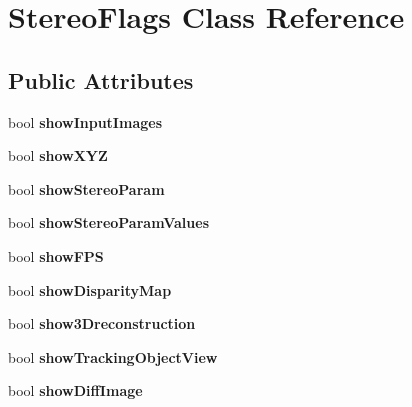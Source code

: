 \hypertarget{class_stereo_flags}{}\section{Stereo\+Flags Class Reference}
\label{class_stereo_flags}
\subsection*{Public Attributes}
\begin{DoxyCompactItemize}
\item 
bool {\bfseries show\+Input\+Images}\hypertarget{class_stereo_flags_af25bd7777d888a82559ebe8d5030cd80}{}\label{class_stereo_flags_af25bd7777d888a82559ebe8d5030cd80}

\item 
bool {\bfseries show\+X\+YZ}\hypertarget{class_stereo_flags_a0cb450ccdbb7c5709a7f33aec9d38577}{}\label{class_stereo_flags_a0cb450ccdbb7c5709a7f33aec9d38577}

\item 
bool {\bfseries show\+Stereo\+Param}\hypertarget{class_stereo_flags_af3a86ddf69d522df6f8073b47a703965}{}\label{class_stereo_flags_af3a86ddf69d522df6f8073b47a703965}

\item 
bool {\bfseries show\+Stereo\+Param\+Values}\hypertarget{class_stereo_flags_a058ef7fe9d3a7f4c5188df9b47654829}{}\label{class_stereo_flags_a058ef7fe9d3a7f4c5188df9b47654829}

\item 
bool {\bfseries show\+F\+PS}\hypertarget{class_stereo_flags_ae9cd1edf3802628e0e06a28d23fafb21}{}\label{class_stereo_flags_ae9cd1edf3802628e0e06a28d23fafb21}

\item 
bool {\bfseries show\+Disparity\+Map}\hypertarget{class_stereo_flags_aec726fd334f33b376a8cc46b74fa4998}{}\label{class_stereo_flags_aec726fd334f33b376a8cc46b74fa4998}

\item 
bool {\bfseries show3\+Dreconstruction}\hypertarget{class_stereo_flags_a15823a173e7ce52bb5792f7cf745d62b}{}\label{class_stereo_flags_a15823a173e7ce52bb5792f7cf745d62b}

\item 
bool {\bfseries show\+Tracking\+Object\+View}\hypertarget{class_stereo_flags_acc19d7926c07f5c1fe937acf10560612}{}\label{class_stereo_flags_acc19d7926c07f5c1fe937acf10560612}

\item 
bool {\bfseries show\+Diff\+Image}\hypertarget{class_stereo_flags_aa4a42577d85965e0edcb3bd5d57f5e6a}{}\label{class_stereo_flags_aa4a42577d85965e0edcb3bd5d57f5e6a}


\end{DoxyCompactItemize}
